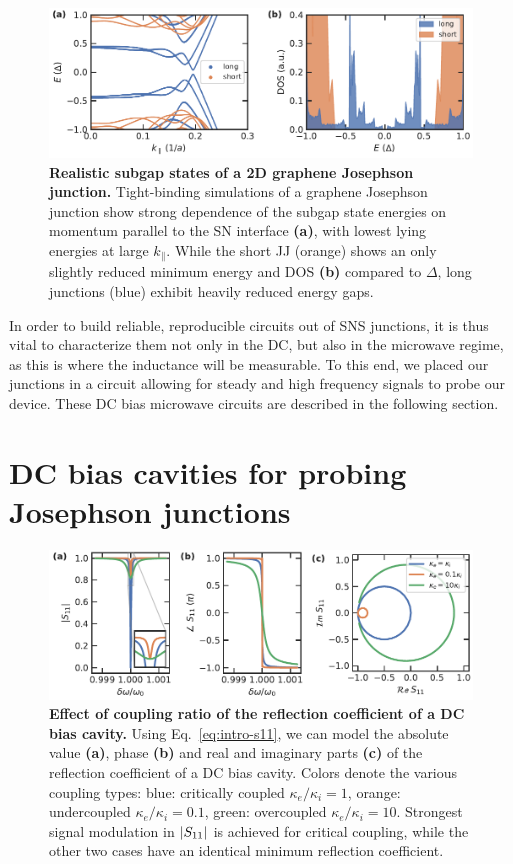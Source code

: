 \begin{figure}[t]
	\centering
	\includegraphics[width=\linewidth]{chapter-introduction/figs/kwant_modeling_181206_subgap_length_supp_Plot_subgap_dos}
	\caption{
		\textbf{Realistic subgap states of a 2D graphene Josephson junction.}
		Tight-binding simulations of a graphene Josephson junction show strong dependence of the subgap state energies on momentum parallel to the SN interface \textbf{(a)}, with lowest lying energies at large $k_\parallel$.
		While the short JJ (orange) shows an only slightly reduced minimum energy and DOS \textbf{(b)} compared to $\Delta$, long junctions (blue) exhibit heavily reduced energy gaps.
	}
	\label{fig:modelsubgap}
\end{figure}

In order to build reliable, reproducible circuits out of SNS junctions, it is thus vital to characterize them not only in the DC, but also in the microwave regime, as this is where the inductance will be measurable.
%
To this end, we placed our junctions in a circuit allowing for steady and high frequency signals to probe our device.
%
These DC bias microwave circuits are described in the following section.

\section{DC bias cavities for probing Josephson junctions}

\begin{figure}[t]
	\centering
	\includegraphics[width=\linewidth]{chapter-introduction/figs/model_DC_bias_cavity_coupling.pdf}
	\caption{
		\textbf{Effect of coupling ratio of the reflection coefficient of a DC bias cavity.}
		Using Eq.~\ref{eq:intro-s11}, we can model the absolute value \textbf{(a)}, phase \textbf{(b)} and real and imaginary parts \textbf{(c)} of the reflection coefficient of a DC bias cavity.
		Colors denote the various coupling types: blue: critically coupled $\kappa_e/\kappa_i=1$, orange: undercoupled $\kappa_e/\kappa_i=0.1$, green: overcoupled $\kappa_e/\kappa_i=10$.
		Strongest signal modulation in $\lvert S_{11}\rvert$ is achieved for critical coupling, while the other two cases have an identical minimum reflection coefficient.
	}
	\label{fig:s11}
\end{figure}


